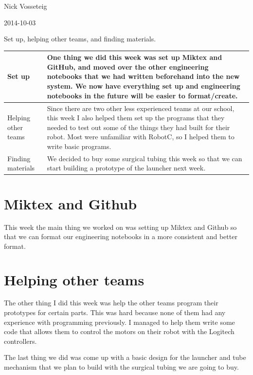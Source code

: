 Nick Vosseteig

2014-10-03

Set up, helping other teams, and finding materials.

\begin{tabular}{|p{5cm}|p{5cm}|}
 \hline
 Set up&
One thing we did this week was set up Miktex and GitHub, and moved over the other engineering notebooks that we had written beforehand into the new system. We now have everything set up and engineering notebooks in the future will be easier to format/create.
 \\
 \hline
Helping other teams&
Since there are two other less experienced teams at our school, this week I also helped them set up the programs that they needed to test out some of the things they had built for their robot. Most were unfamiliar with RobotC, so I helped them to write basic programs.
 \\
 \hline
 Finding materials&
We decided to buy some surgical tubing this week so that we can start building a prototype of the launcher next week.
 \\
 \hline
\end{tabular}

\section*{Miktex and Github}
This week the main thing we worked on was setting up Miktex and Github so that we can format our engineering notebooks in a more consistent and better format.

\section*{Helping other teams}
The other thing I did this week was help the other teams program their prototypes for certain parts. This was hard because none of them had any experience with programming previously. I managed to help them write some code that allows them to control the motors on their robot with the Logitech controllers.

The last thing we did was come up with a basic design for the launcher and tube mechanism that we plan to build with the surgical tubing we are going to buy.

